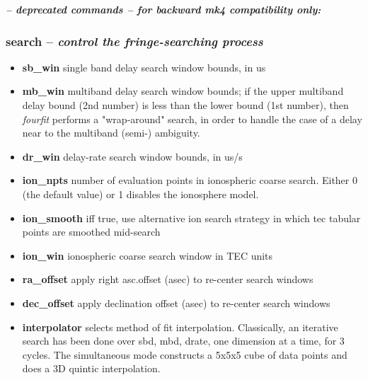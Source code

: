 \vspace{0.3in}
\textbf{\textit{-- deprecated commands -- for backward mk4 compatibility only:}} \\
\vspace{0.3in}

\subsubsection{search -- \textit{control the fringe-searching process}}

\begin{itemize}
\item[]\textbf{sb\_win}       single band delay search window bounds, in us
\item[]\textbf{mb\_win}       multiband delay search window bounds; if the upper
                 multiband delay bound (2nd number) is less than the lower bound
                 (1st number), then \textit{fourfit} performs a "wrap-around" search, in
                 order to handle the case of a delay near to the multiband
                 (semi-) ambiguity.
\item[]\textbf{dr\_win}       delay-rate search window bounds, in us/s 
\item[]\textbf{ion\_npts}     number of evaluation points in ionospheric coarse search.
        Either 0 (the default value) or 1 disables the ionosphere model.
\item[]\textbf{ion\_smooth}   iff true, use alternative ion search strategy in which
        tec tabular points are smoothed mid-search
\item[]\textbf{ion\_win}      ionospheric coarse search window in TEC units
\item[]\textbf{ra\_offset}    apply right asc.offset (asec) to re-center search windows
\item[]\textbf{dec\_offset}   apply declination offset (asec) to re-center search windows
\item[]\textbf{interpolator} selects method of fit interpolation. Classically, an
                 iterative search has been done over sbd, mbd, drate, one
                 dimension at a time, for 3 cycles. The simultaneous mode
                 constructs a 5x5x5 cube of data points and does a 3D
                 quintic interpolation.
\end{itemize}


